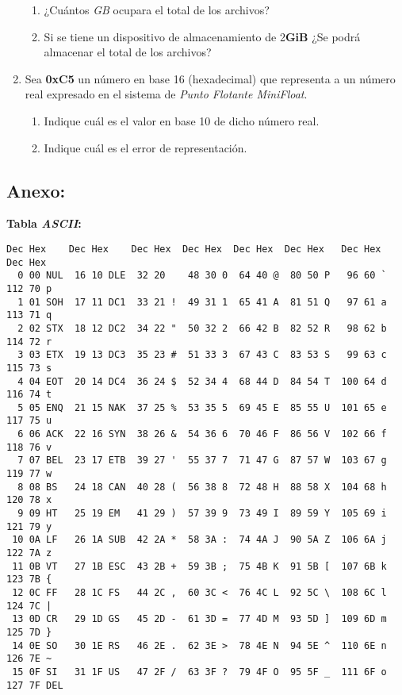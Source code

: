 \documentclass[12pt]{article}
\begin{document}
\begin{enumerate}
        \begin{enumerate}

            \item ¿Cuántos \emph{GB} ocupara el total de los archivos?

            \item Si se tiene un dispositivo de almacenamiento de
            2\textbf{GiB} ¿Se podrá almacenar el total de los archivos?

        \end{enumerate}

    \item Sea \textbf{0xC5} un número en base 16 (hexadecimal) que
        representa a un número real expresado en el sistema de \emph{Punto
        Flotante MiniFloat}.

        \begin{enumerate}

            \item Indique cuál es el valor en base 10 de dicho número real.

            \item Indique cuál es el error de representación.

        \end{enumerate}


\end{enumerate}

\subsection*{ \large\textbf{Anexo:} }

\textbf{Tabla \emph{ASCII}:}

\begin{verbatim}
Dec Hex    Dec Hex    Dec Hex  Dec Hex  Dec Hex  Dec Hex   Dec Hex   Dec Hex
  0 00 NUL  16 10 DLE  32 20    48 30 0  64 40 @  80 50 P   96 60 `  112 70 p
  1 01 SOH  17 11 DC1  33 21 !  49 31 1  65 41 A  81 51 Q   97 61 a  113 71 q
  2 02 STX  18 12 DC2  34 22 "  50 32 2  66 42 B  82 52 R   98 62 b  114 72 r
  3 03 ETX  19 13 DC3  35 23 #  51 33 3  67 43 C  83 53 S   99 63 c  115 73 s
  4 04 EOT  20 14 DC4  36 24 $  52 34 4  68 44 D  84 54 T  100 64 d  116 74 t
  5 05 ENQ  21 15 NAK  37 25 %  53 35 5  69 45 E  85 55 U  101 65 e  117 75 u
  6 06 ACK  22 16 SYN  38 26 &  54 36 6  70 46 F  86 56 V  102 66 f  118 76 v
  7 07 BEL  23 17 ETB  39 27 '  55 37 7  71 47 G  87 57 W  103 67 g  119 77 w
  8 08 BS   24 18 CAN  40 28 (  56 38 8  72 48 H  88 58 X  104 68 h  120 78 x
  9 09 HT   25 19 EM   41 29 )  57 39 9  73 49 I  89 59 Y  105 69 i  121 79 y
 10 0A LF   26 1A SUB  42 2A *  58 3A :  74 4A J  90 5A Z  106 6A j  122 7A z
 11 0B VT   27 1B ESC  43 2B +  59 3B ;  75 4B K  91 5B [  107 6B k  123 7B {
 12 0C FF   28 1C FS   44 2C ,  60 3C <  76 4C L  92 5C \  108 6C l  124 7C |
 13 0D CR   29 1D GS   45 2D -  61 3D =  77 4D M  93 5D ]  109 6D m  125 7D }
 14 0E SO   30 1E RS   46 2E .  62 3E >  78 4E N  94 5E ^  110 6E n  126 7E ~
 15 0F SI   31 1F US   47 2F /  63 3F ?  79 4F O  95 5F _  111 6F o  127 7F DEL
\end{verbatim}
\end{document}
